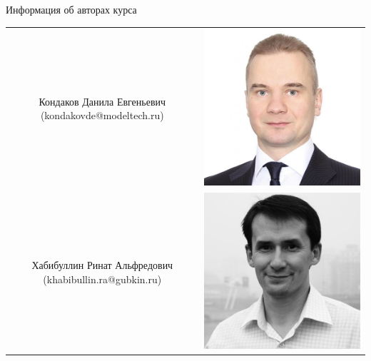 \begin{frame}
\titlepage
\end{frame}

\begin{frame}{Информация об авторах курса}

\begin{center}
\begin{tabular}{ c c  }
 Кондаков Данила Евгеньевич  (kondakovde@modeltech.ru)  & \includegraphics[scale=0.2]{fig/kondakov.jpeg}  \\ 
 Хабибуллин Ринат Альфредович  (khabibullin.ra@gubkin.ru) &\includegraphics[scale=0.15]{fig/khabibullin.jpeg}
\end{tabular}
\end{center}


\end{frame}
